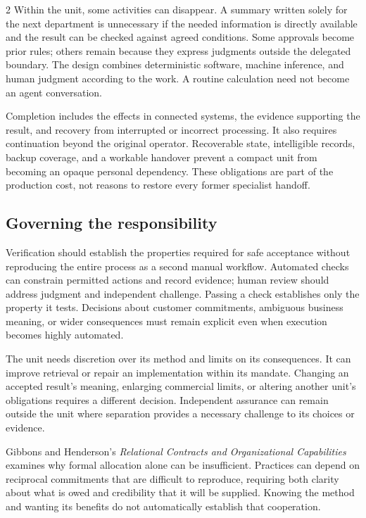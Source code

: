 \begin{multicols}{2}
Within the unit, some activities can disappear. A summary written solely
for the next department is unnecessary if the needed information is
directly available and the result can be checked against agreed
conditions. Some approvals become prior rules; others remain because
they express judgments outside the delegated boundary. The design
combines deterministic software, machine inference, and human judgment
according to the work. A routine calculation need not become an agent
conversation.

Completion includes the effects in connected systems, the evidence
supporting the result, and recovery from interrupted or incorrect
processing. It also requires continuation beyond the original operator.
Recoverable state, intelligible records, backup coverage, and a workable
handover prevent a compact unit from becoming an opaque personal
dependency. These obligations are part of the production cost, not
reasons to restore every former specialist handoff.

\subsection{Governing the
responsibility}\label{governing-the-responsibility}

Verification should establish the properties required for safe
acceptance without reproducing the entire process as a second manual
workflow. Automated checks can constrain permitted actions and record
evidence; human review should address judgment and independent
challenge. Passing a check establishes only the property it tests.
Decisions about customer commitments, ambiguous business meaning, or
wider consequences must remain explicit even when execution becomes
highly automated.

The unit needs discretion over its method and limits on its
consequences. It can improve retrieval or repair an implementation
within its mandate. Changing an accepted result's meaning, enlarging
commercial limits, or altering another unit's obligations requires a
different decision. Independent assurance can remain outside the unit
where separation provides a necessary challenge to its choices or
evidence.

Gibbons and Henderson's \emph{Relational Contracts and Organizational
Capabilities} \citep{gibbons2012contracts} examines why formal
allocation alone can be insufficient. Practices can depend on reciprocal
commitments that are difficult to reproduce, requiring both clarity
about what is owed and credibility that it will be supplied. Knowing the
method and wanting its benefits do not automatically establish that
cooperation.


\end{multicols}
